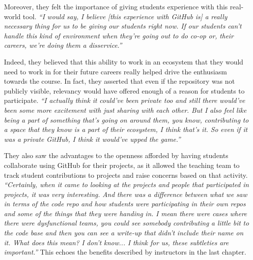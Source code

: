 Moreover, they felt the importance of giving students experience with this real-world tool. \textit{``I would say, I believe [this experience with GitHub is] a really necessary thing for us to be giving our students right now. If our students can't handle this kind of environment when they're going out to do co-op or, their careers, we're doing them a disservice.''}

Indeed, they believed that this ability to work in an ecosystem that they would need to work in for their future careers really helped drive the enthusiasm towards the course. In fact, they asserted that even if the repository was not publicly visible, relevancy would have offered enough of a reason for students to participate. \textit{``I actually think it could've been private too and still there would've been some more excitement with just sharing with each other. But I also feel like being a part of something that's going on around them, you know, contributing to a space that they know is a part of their ecosystem, I think that's it. So even if it was a private GitHub, I think it would've upped the game.''}


They also saw the advantages to the openness afforded by having students collaborate using GitHub for their projects, as it allowed the teaching team to track student contributions to projects and raise concerns based on that activity. \textit{``Certainly, when it came to looking at the projects and people that participated in projects, it was very interesting. And there was a difference between what we saw in terms of the code repo and how students were participating in their own repos and some of the things that they were handing in. I mean there were cases where there were dysfunctional teams, you could see somebody contributing a little bit to the code base and then you can see a write-up that didn't include their name on it. What does this mean? I don't know... I think for us, these subtleties are important.''}
This echoes the benefits described by instructors in the last chapter.


